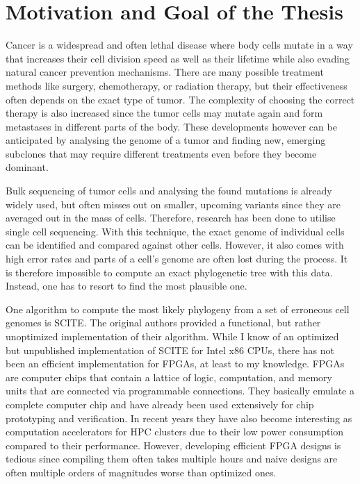 \section{Motivation and Goal of the Thesis}

Cancer is a widespread and often lethal disease\cite{10.1001/jamaoncol.2021.6987} where body cells mutate in a way that increases their cell division speed as well as their lifetime while also evading natural cancer prevention mechanisms. There are many possible treatment methods like surgery, chemotherapy, or radiation therapy, but their effectiveness often depends on the exact type of tumor. The complexity of choosing the correct therapy is also increased since the tumor cells may mutate again and form metastases in different parts of the body. These developments however can be anticipated by analysing the genome of a tumor and finding new, emerging subclones that may require different treatments even before they become dominant.

Bulk sequencing of tumor cells and analysing the found mutations is already widely used, but often misses out on smaller, upcoming variants since they are averaged out in the mass of cells. Therefore, research has been done to utilise single cell sequencing. With this technique, the exact genome of individual cells can be identified and compared against other cells. However, it also comes with high error rates and parts of a cell's genome are often lost during the process. It is therefore impossible to compute an exact phylogenetic tree with this data. Instead, one has to resort to find the most plausible one.

One algorithm to compute the most likely phylogeny from a set of erroneous cell genomes is \ac{SCITE}\cite{tree2016}. The original authors provided a functional, but rather unoptimized implementation of their algorithm. While I know of an optimized but unpublished implementation of \ac{SCITE} for Intel x86 CPUs, there has not been an efficient implementation for \acp{FPGA}, at least to my knowledge. \acp{FPGA} are computer chips that contain a lattice of logic, computation, and memory units that are connected via programmable connections. They basically emulate a complete computer chip and have already been used extensively for chip prototyping and verification. In recent years they have also become interesting as computation accelerators for \ac{HPC} clusters due to their low power consumption compared to their performance. However, developing efficient \ac{FPGA} designs is tedious since compiling them often takes multiple hours and naive designs are often multiple orders of magnitudes worse than optimized ones. 

